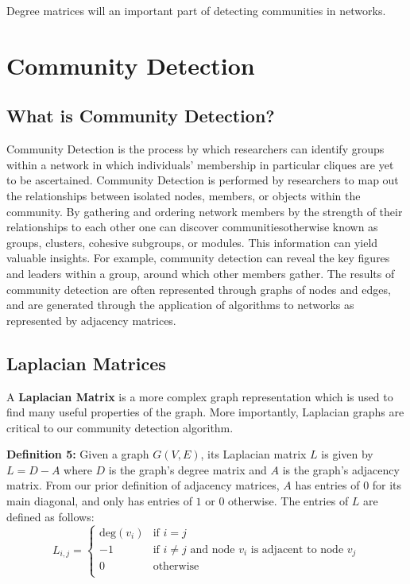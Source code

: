 \documentclass{article}
\begin{document}
\noindent Degree matrices will an important part of detecting communities in networks.

\bigskip 

\section*{Community Detection}

\subsection*{What is Community Detection?}

Community Detection is the process by which researchers can identify groups within a network in which individuals' membership in particular cliques are yet to be ascertained. 
Community Detection is performed by researchers to map out the relationships between isolated nodes, members, or objects within the community. 
By gathering and ordering network members by the strength of their relationships to each other one can discover communities\textemdash otherwise known as groups, clusters, cohesive subgroups, or modules. 
This information can yield valuable insights. For example, community detection can reveal the key figures and leaders within a group, around which other members gather.
The results of community detection are often represented through graphs of nodes and edges, and are generated through the application of algorithms to networks as represented by adjacency matrices.

\subsection*{Laplacian Matrices}

A \textbf{Laplacian Matrix} is a more complex graph representation  which is used to find many useful properties of the graph. More importantly, Laplacian graphs are critical to our community detection algorithm.

\bigskip 

\textbf{Definition 5:} Given a graph $G(V, E)$, its Laplacian matrix $L$ is given by $L = D - A$ where $D$ is the graph's degree matrix and $A$ is the graph's adjacency matrix. From our prior definition of adjacency matrices, $A$ has entries of $0$ for its main diagonal, and only has entries of $1$ or $0$ otherwise. The entries of $L$ are defined as follows:
\[   
L_{i,j} = 
     \begin{cases}
       \text{deg} (v_i) & \text{if } i = j \\
       -1 & \text{if } i \neq j \text{ and} \text{ node } v_i \text{ is adjacent to} \text{ node } v_j\\
       0 & \text{otherwise} \\
     \end{cases}
\]
\end{document}
